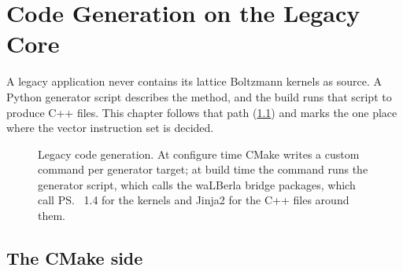 \chapter{Code Generation on the Legacy Core}\label{r04:ch:codegen}

A legacy application never contains its lattice Boltzmann kernels as source. A Python
generator script describes the method, and the build runs that script to produce C++
files. This chapter follows that path (\cref{r04:fig:codegen-flow}) and marks the one
place where the vector instruction set is decided.

\begin{figure}[htbp]
  \centering
  \resizebox{\linewidth}{!}{}
  \caption[Legacy code generation, from CMake to compiled sweeps]{Legacy code generation.
    At configure time CMake writes a custom command per generator target; at build time
    the command runs the generator script, which calls the waLBerla bridge packages,
    which call \ps{}~1.4 for the kernels and Jinja2 for the C++ files around them.}
  \label{r04:fig:codegen-flow}
\end{figure}

\section{The CMake side}\label{r04:sec:cmake}

